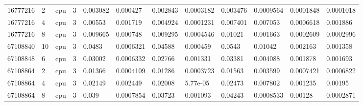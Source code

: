 \begin{tabular}{llllllllllll}
16777216 & 2 & cpu & 3 & 0.003082 & 0.000427 & 0.002843 & 0.0003182 & 0.003476 & 0.0009564 & 0.0001848 & 0.0001018 \\
16777216 & 4 & cpu & 3 & 0.00553 & 0.001719 & 0.004924 & 0.0001231 & 0.007401 & 0.007053 & 0.0006618 & 0.001886 \\
16777216 & 8 & cpu & 3 & 0.009665 & 0.000748 & 0.009295 & 0.0004546 & 0.01021 & 0.001663 & 0.0002609 & 0.0002996 \\
67108840 & 10 & cpu & 3 & 0.0483 & 0.0006321 & 0.04588 & 0.000459 & 0.0543 & 0.01042 & 0.002163 & 0.001358 \\
67108848 & 6 & cpu & 3 & 0.03002 & 0.0006332 & 0.02766 & 0.001331 & 0.03381 & 0.004088 & 0.001878 & 0.001693 \\
67108864 & 2 & cpu & 3 & 0.01366 & 0.0004109 & 0.01286 & 0.0003723 & 0.01563 & 0.003599 & 0.0007421 & 0.0006822 \\
67108864 & 4 & cpu & 3 & 0.02149 & 0.002449 & 0.02008 & 5.77e-05 & 0.02473 & 0.007802 & 0.001235 & 0.00195 \\
67108864 & 8 & cpu & 3 & 0.039 & 0.0007854 & 0.03723 & 0.001093 & 0.04243 & 0.0008533 & 0.00128 & 0.0002871 \\
\hline
\end{tabular}
